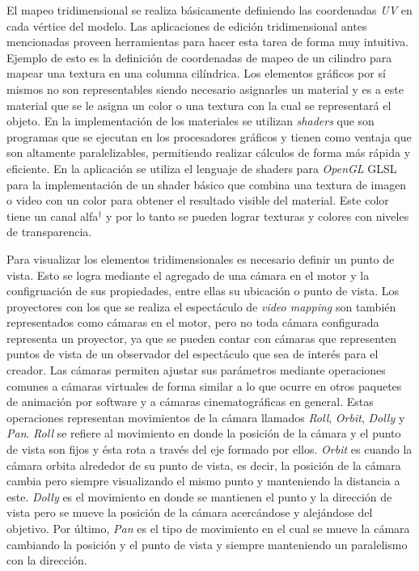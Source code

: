 El mapeo tridimensional se realiza básicamente definiendo las coordenadas \emph{UV} en cada vértice del modelo. Las aplicaciones de edición tridimensional antes mencionadas proveen herramientas para hacer esta tarea de forma muy intuitiva. Ejemplo de esto es la definición de coordenadas de mapeo de un cilindro para mapear una textura en una columna cilíndrica.
Los elementos gráficos por sí mismos no son representables siendo necesario asignarles un material y es a este material que se le asigna un color o una textura con la cual se representará el objeto.
En la implementación de los materiales se utilizan \emph{shaders} que son programas que se ejecutan en los procesadores gráficos y tienen como ventaja que son altamente paralelizables, permitiendo realizar cálculos de forma más rápida y eficiente. En la aplicación se utiliza el lenguaje de shaders para \emph{OpenGL} GLSL\cite{GLSL} para la implementación de un shader básico que combina una textura de imagen o video con un color para obtener el resultado visible del material. Este color tiene un canal alfa$^\dagger$ y por lo tanto se pueden lograr texturas y colores con niveles de transparencia.

Para visualizar los elementos tridimensionales es necesario definir un punto de vista. Esto se logra mediante el agregado de una cámara en el motor y la configruación de sus propiedades, entre ellas su ubicación o punto de vista. Los proyectores con los que se realiza el espectáculo de \emph{video mapping} son también representados como cámaras en el motor, pero no toda cámara configurada representa un proyector, ya que se pueden contar con cámaras que representen puntos de vista de un observador del espectáculo que sea de interés para el creador.
Las cámaras permiten ajustar sus parámetros mediante operaciones comunes a cámaras virtuales de forma similar a lo que ocurre en otros paquetes de animación por software y a cámaras cinematográficas en general. Estas operaciones representan movimientos de la cámara llamados \emph{Roll}, \emph{Orbit}, \emph{Dolly} y \emph{Pan}. \emph{Roll} se refiere al movimiento en donde la posición de la cámara y el punto de vista son fijos y ésta rota a través del eje formado por ellos. \emph{Orbit} es cuando la cámara orbita alrededor de su punto de vista, es decir, la posición de la cámara cambia pero siempre visualizando el mismo punto y manteniendo la distancia a este. \emph{Dolly} es el movimiento en donde se mantienen el punto y la dirección de vista pero se mueve la posición de la cámara acercándose y alejándose del objetivo. Por último, \emph{Pan} es el tipo de movimiento en el cual se mueve la cámara cambiando la posición y el punto de vista y siempre manteniendo un paralelismo con la dirección.

